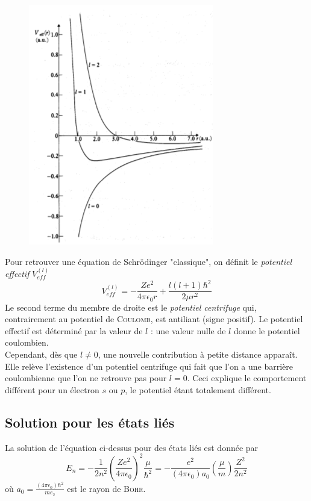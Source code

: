 	\begin{figure}
	\vspace{-5mm}
	\includegraphics[scale=0.4]{ch1/image2}
	\end{figure}
Pour retrouver une équation de Schrödinger "classique", on définit le \textit{potentiel effectif} $V_{eff}^{(l)}$
\begin{equation}
V_{eff}^{(l)} = -\frac{Ze^2}{4\pi\epsilon_0r}+\dfrac{l(l+1)\hbar^2}{2\mu r^2}
\end{equation}
Le second terme du membre de droite est le \textit{potentiel centrifuge} qui, contrairement au potentiel
de \textsc{Coulomb}, est antiliant (signe positif). Le potentiel effectif est déterminé par la valeur de
$l$ : une valeur nulle de $l$ donne le potentiel coulombien.\\

Cependant, dès que $l\neq 0$, une nouvelle contribution à petite distance apparaît. Elle relève l'existence d'un
potentiel centrifuge qui fait que l'on a une barrière coulombienne que l'on ne retrouve pas pour $l=0$. Ceci
explique le comportement différent pour un électron $s$ ou $p$, le potentiel étant totalement différent.


\newpage
\subsection{Solution pour les états liés}
La solution de l'équation ci-dessus pour des états liés est donnée par 
\begin{equation}
E_n = -\frac{1}{2n^2}\left(\frac{Ze^2}{4\pi\epsilon_0}\right)^2\frac{\mu}{\hbar^2}=-\frac{e^2}{(4\pi\epsilon_0)
a_0}\left(\frac{\mu}{m}\right)\frac{Z^2}{2n^2}
\end{equation}
où $a_0=\frac{(4\pi\epsilon_0)\hbar^2}{me_2}$ est le rayon de \textsc{Bohr}.\\

